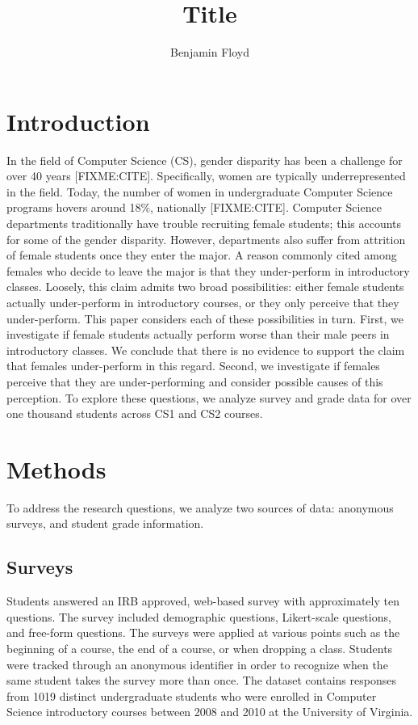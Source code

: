 \documentclass[a4paper,man,natbib]{apa6}
\title{Title}
\author{Benjamin Floyd}
\affiliation{University of Virginia}
\begin{document}
\maketitle

\section{Introduction}
\label{sec:intro}

In the field of Computer Science (CS), gender disparity has been a challenge for
over 40 years [FIXME:CITE]. Specifically, women are typically underrepresented
in the field. Today, the number of women in undergraduate Computer Science
programs hovers around 18\%, nationally [FIXME:CITE]. Computer Science
departments traditionally have trouble recruiting female students; this
accounts for some of the gender disparity. However, departments also suffer
from attrition of female students once they enter the major. A reason commonly
cited among females who decide to leave the major is that they
under-perform in introductory classes. Loosely, this claim admits two broad
possibilities: either female students actually under-perform in introductory
courses, or they only perceive that they under-perform. This paper considers
each of these possibilities in turn. First, we investigate if female students
actually perform worse than their male peers in introductory classes. We
conclude that there is no evidence to support the claim that females
under-perform in this regard. Second, we investigate if females perceive that
they are under-performing and consider possible causes of this perception.
To explore these questions, we analyze survey and grade data for over one
thousand students across CS1 and CS2 courses.

\section{Methods}
\label{sec:methods}
To address the research questions, we analyze two sources of data: anonymous
surveys, and student grade information. 

\subsection{Surveys}
\label{sec:survey}
Students answered an IRB approved, web-based survey with approximately ten
questions. The survey included demographic questions, Likert-scale questions,
and free-form questions. The surveys were applied at various points such as the
beginning of a course, the end of a course, or when dropping a class. Students
were tracked through an anonymous identifier in order to recognize when the
same student takes the survey more than once. The dataset contains responses
from 1019 distinct undergraduate students who were enrolled in Computer Science
introductory courses between 2008 and 2010 at the University of Virginia.
\end{document}
